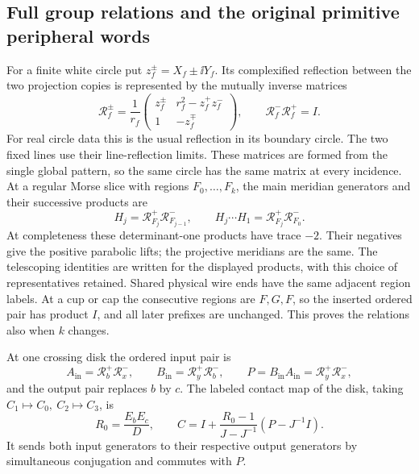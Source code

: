 \subsection{Full group relations and the original primitive peripheral
words}\label{mcg:sec-5}

For a finite white circle put $z_f^\pm=X_f\pm\ii Y_f$. Its
complexified reflection between the two projection copies is represented
by the mutually inverse matrices
\[
 \mathcal R_f^\pm=\frac1{r_f}
 \begin{pmatrix}
 z_f^\pm&r_f^2-z_f^+z_f^-\\
 1&-z_f^\mp
 \end{pmatrix},\qquad \mathcal R_f^-\mathcal R_f^+=I.
\]
For real circle data this is the usual reflection in its boundary
circle. The two fixed lines use their line-reflection limits. These
matrices are formed from the single global pattern, so the same circle
has the same matrix at every incidence. At a regular Morse slice with regions \(F_0,\ldots,F_k\),
the main meridian generators and their successive products are \begin{equation}\label{mcg:eq-12}
H_j=\mathcal R_{F_j}^+\mathcal R_{F_{j-1}}^-,
 \qquad
 H_j\cdots H_1=\mathcal R_{F_j}^+\mathcal R_{F_0}^- .
\end{equation} At completeness these determinant-one products have trace $-2$.
Their negatives give the positive parabolic lifts; the projective
meridians are the same. The telescoping identities are written for
the displayed products, with this choice of representatives retained. Shared
physical wire ends have the same adjacent region labels. At a cup or cap
the consecutive regions are \(F,G,F\), so the inserted ordered pair has
product \(I\), and all later prefixes are unchanged. This proves the
relations also when \(k\) changes.

At one crossing disk the ordered input pair is \begin{equation}\label{mcg:eq-13}
A_{\mathrm{in}}=\mathcal R_b^+\mathcal R_x^-,\qquad
 B_{\mathrm{in}}=\mathcal R_y^+\mathcal R_b^-,\qquad
 P=B_{\mathrm{in}}A_{\mathrm{in}}=\mathcal R_y^+\mathcal R_x^-,
\end{equation} and the output pair replaces \(b\) by \(c\). The labeled contact map
of the disk, taking \(C_1\mapsto C_0,\ C_2\mapsto C_3\), is \begin{equation}\label{mcg:eq-14}
R_0=\frac{E_bE_c}{D},\qquad
 C=I+\frac{R_0-1}{J-J^{-1}}(P-J^{-1}I).
\end{equation} It sends both input generators to their respective output generators
by simultaneous conjugation and commutes with \(P\).

